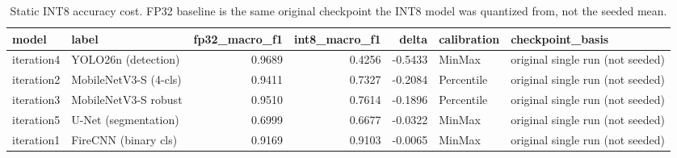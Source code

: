 \begin{table}
\caption{Static INT8 accuracy cost. FP32 baseline is the same original checkpoint the INT8 model was quantized from, not the seeded mean.}
\begin{tabular}{llrrrll}
\toprule
model & label & fp32\_macro\_f1 & int8\_macro\_f1 & delta & calibration & checkpoint\_basis \\
\midrule
iteration4 & YOLO26n (detection) & 0.9689 & 0.4256 & -0.5433 & MinMax & original single run (not seeded) \\
iteration2 & MobileNetV3-S (4-cls) & 0.9411 & 0.7327 & -0.2084 & Percentile & original single run (not seeded) \\
iteration3 & MobileNetV3-S robust & 0.9510 & 0.7614 & -0.1896 & Percentile & original single run (not seeded) \\
iteration5 & U-Net (segmentation) & 0.6999 & 0.6677 & -0.0322 & MinMax & original single run (not seeded) \\
iteration1 & FireCNN (binary cls) & 0.9169 & 0.9103 & -0.0065 & MinMax & original single run (not seeded) \\
\bottomrule
\end{tabular}
\end{table}
